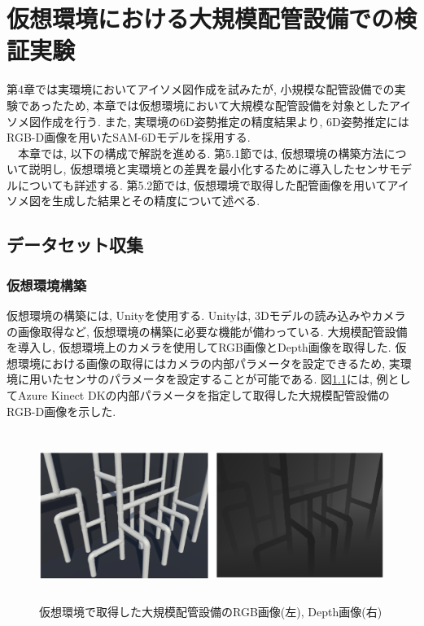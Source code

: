 ﻿\chapter{仮想環境における大規模配管設備での検証実験}
第4章では実環境においてアイソメ図作成を試みたが, 小規模な配管設備での実験であったため, 本章では仮想環境において大規模な配管設備を対象としたアイソメ図作成を行う. 
また, 実環境の6D姿勢推定の精度結果より, 6D姿勢推定にはRGB-D画像を用いたSAM-6Dモデルを採用する. \\
　本章では, 以下の構成で解説を進める. 
第5.1節では, 仮想環境の構築方法について説明し, 仮想環境と実環境との差異を最小化するために導入したセンサモデルについても詳述する. 
第5.2節では, 仮想環境で取得した配管画像を用いてアイソメ図を生成した結果とその精度について述べる. 

\section{データセット収集}
\subsection{仮想環境構築}
仮想環境の構築には, Unityを使用する. Unityは, 3Dモデルの読み込みやカメラの画像取得など, 仮想環境の構築に必要な機能が備わっている. 
大規模配管設備を導入し, 仮想環境上のカメラを使用してRGB画像とDepth画像を取得した. 
仮想環境における画像の取得にはカメラの内部パラメータを設定できるため, 実環境に用いたセンサのパラメータを設定することが可能である. 
図\ref{fig:5-f1}には, 例としてAzure Kinect DKの内部パラメータを指定して取得した大規模配管設備のRGB-D画像を示した. 
\begin{figure}[htbt]
    \centering
    \includegraphics[height=55mm]{Figure/ex_sim.eps}
    \caption{仮想環境で取得した大規模配管設備のRGB画像(左), Depth画像(右)}
    \label{fig:5-f1}
\end{figure}

